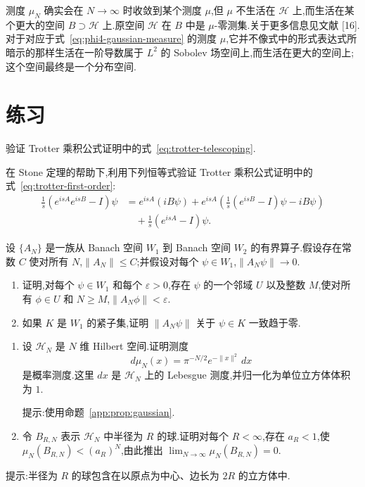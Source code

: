 测度 $\mu_N$ 确实会在 $N\to\infty$ 时收敛到某个测度 $\mu$,但 $\mu$ 不生活在 $\mathcal H$ 上,而生活在某个更大的空间 $B\supset\mathcal H$ 上.原空间 $\mathcal H$ 在 $B$ 中是 $\mu$-零测集.关于更多信息见文献 [16].对于对应于式~\eqref{eq:phi4-gaussian-measure} 的测度 $\mu$,它并不像式中的形式表达式所暗示的那样生活在一阶导数属于 $L^2$ 的 Sobolev 场空间上,而生活在更大的空间上;这个空间最终是一个分布空间.

\section{练习}
\label{sec:chapter20-exercises}

\begin{exercise}\label{ex:trotter-telescoping}
验证 Trotter 乘积公式证明中的式~\eqref{eq:trotter-telescoping}.
\end{exercise}

\begin{exercise}\label{ex:trotter-first-order}
在 Stone 定理的帮助下,利用下列恒等式验证 Trotter 乘积公式证明中的式~\eqref{eq:trotter-first-order}:
\[
\begin{aligned}
 \frac1s(e^{isA}e^{isB}-I)\psi
 &=e^{isA}(iB\psi)
 +e^{isA}\left(\frac1s(e^{isB}-I)\psi-iB\psi\right)\\
 &\quad+\frac1s(e^{isA}-I)\psi.
\end{aligned}
\]
\end{exercise}

\begin{exercise}[一致收敛于紧集]\label{ex:uniform-on-compact}
设 $\{A_N\}$ 是一族从 Banach 空间 $W_1$ 到 Banach 空间 $W_2$ 的有界算子.假设存在常数 $C$ 使对所有 $N$,$\|A_N\|\le C$;并假设对每个 $\psi\in W_1$,$\|A_N\psi\|\to0$.
\begin{enumerate}
\item 证明,对每个 $\psi\in W_1$ 和每个 $\varepsilon>0$,存在 $\psi$ 的一个邻域 $U$ 以及整数 $M$,使对所有 $\phi\in U$ 和 $N\ge M$,$\|A_N\phi\|<\varepsilon$.
\item 如果 $K$ 是 $W_1$ 的紧子集,证明 $\|A_N\psi\|$ 关于 $\psi\in K$ 一致趋于零.
\end{enumerate}
\end{exercise}

\begin{exercise}\label{ex:gaussian-mass-escape}
\begin{enumerate}
\item 设 $\mathcal H_N$ 是 $N$ 维 Hilbert 空间.证明测度
\[
 d\mu_N(x)=\pi^{-N/2}e^{-\|x\|^2}\,dx
\]
是概率测度.这里 $dx$ 是 $\mathcal H_N$ 上的 Lebesgue 测度,并归一化为单位立方体体积为 $1$.

提示:使用命题~\ref{app:prop:gaussian}.
\item 令 $B_{R,N}$ 表示 $\mathcal H_N$ 中半径为 $R$ 的球.证明对每个 $R<\infty$,存在 $a_R<1$,使 $\mu_N(B_{R,N})<(a_R)^N$,由此推出 $\lim_{N\to\infty}\mu_N(B_{R,N})=0$.
\end{enumerate}

提示:半径为 $R$ 的球包含在以原点为中心、边长为 $2R$ 的立方体中.
\end{exercise}
